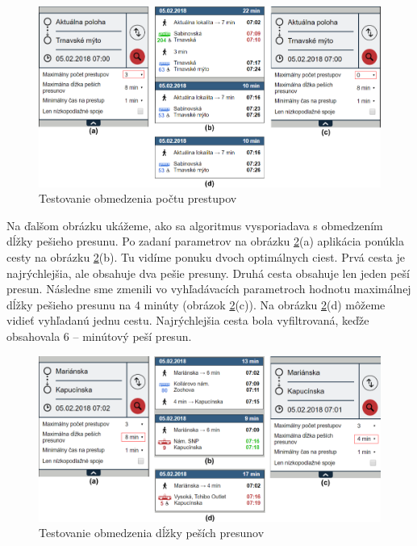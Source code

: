 \begin{figure}[H]
\centerline{\includegraphics[width=1.0\textwidth]{images/test/max-transfers-act}}
\caption[Testovanie obmedzenia počtu prestupov]{Testovanie obmedzenia počtu prestupov}
\label{fig:test-max-transfers}
\end{figure}

Na ďalšom obrázku ukážeme, ako sa algoritmus vysporiadava s obmedzením dĺžky pešieho presunu. Po zadaní parametrov na obrázku \ref{fig:test-max-walking}(a) aplikácia ponúkla cesty na obrázku \ref{fig:test-max-walking}(b). Tu vidíme ponuku dvoch optimálnych ciest. Prvá cesta je najrýchlejšia, ale obsahuje dva pešie presuny. Druhá cesta obsahuje len jeden peší presun. 
Následne sme zmenili vo vyhľadávacích parametroch hodnotu maximálnej dĺžky pešieho presunu na $4$ minúty (obrázok \ref{fig:test-max-walking}(c)). Na obrázku \ref{fig:test-max-walking}(d) môžeme vidieť vyhľadanú jednu cestu. Najrýchlejšia cesta bola vyfiltrovaná, keďže obsahovala $6$ – minútový peší presun. 

\begin{figure}[H]
\centerline{\includegraphics[width=1.0\textwidth]{images/test/max-walking}}
\caption[Testovanie obmedzenia dĺžky peších presunov]{Testovanie obmedzenia dĺžky peších presunov}
\label{fig:test-max-walking}
\end{figure}

